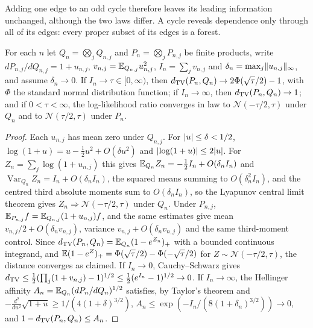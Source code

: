 Adding one edge to an odd cycle therefore leaves its leading information unchanged, although the two
laws differ. A cycle reveals dependence only through all of its edges: every proper subset of its
edges is a forest.

\begin{lemma}\label{spn:lem:product-experiments}
For each $n$ let $Q_n=\bigotimes_jQ_{n,j}$ and $P_n=\bigotimes_jP_{n,j}$ be finite products, write
$dP_{n,j}/dQ_{n,j}=1+u_{n,j}$, $v_{n,j}=\mathbb{E}_{Q_{n,j}}u_{n,j}^2$, $I_n=\sum_jv_{n,j}$ and
$\delta_n=\max_j\lVert u_{n,j}\rVert_\infty$, and assume $\delta_n\to0$. If $I_n\to\tau\in[0,\infty)$,
then $d_{\mathrm{TV}}(P_n,Q_n)\to2\Phi(\sqrt\tau/2)-1$, with $\Phi$ the standard normal distribution
function; if $I_n\to\infty$, then $d_{\mathrm{TV}}(P_n,Q_n)\to1$; and if $0<\tau<\infty$, the log-likelihood
ratio converges in law to $\mathcal N(-\tau/2,\tau)$ under $Q_n$ and to $\mathcal N(\tau/2,\tau)$
under $P_n$.
\end{lemma}

\begin{proof}
Each $u_{n,j}$ has mean zero under $Q_{n,j}$. For $\lvert u\rvert\le\delta<1/2$,
$\log(1+u)=u-\frac12u^2+O(\delta u^2)$ and $\lvert\log(1+u)\rvert\le2\lvert u\rvert$. For
$Z_n=\sum_j\log(1+u_{n,j})$ this gives $\mathbb{E}_{Q_n}Z_n=-\frac12I_n+O(\delta_nI_n)$ and
$\operatorname{Var}_{Q_n}Z_n=I_n+O(\delta_nI_n)$, the squared means summing to
$O(\delta_n^2I_n)$, and the centred third absolute moments sum to $O(\delta_nI_n)$, so the Lyapunov
central limit theorem gives $Z_n\Rightarrow\mathcal N(-\tau/2,\tau)$ under $Q_n$. Under $P_{n,j}$,
$\mathbb{E}_{P_{n,j}}f=\mathbb{E}_{Q_{n,j}}(1+u_{n,j})f$, and the same estimates give mean $v_{n,j}/2+O(\delta_nv_{n,j})$,
variance $v_{n,j}+O(\delta_nv_{n,j})$ and the same third-moment control. Since
$d_{\mathrm{TV}}(P_n,Q_n)=\mathbb{E}_{Q_n}(1-e^{Z_n})_+$ with a bounded continuous integrand, and
$\mathbb{E}(1-e^Z)_+=\Phi(\sqrt\tau/2)-\Phi(-\sqrt\tau/2)$ for $Z\sim\mathcal N(-\tau/2,\tau)$, the
distance converges as claimed. If $I_n\to0$, Cauchy--Schwarz gives
$d_{\mathrm{TV}}\le\frac12(\prod_j(1+v_{n,j})-1)^{1/2}\le\frac12(e^{I_n}-1)^{1/2}\to0$. If $I_n\to\infty$, the
Hellinger affinity $A_n=\mathbb{E}_{Q_n}(dP_n/dQ_n)^{1/2}$ satisfies, by Taylor's theorem and
$-\frac{d^2}{du^2}\sqrt{1+u}\ge1/(4(1+\delta)^{3/2})$,
$A_n\le\exp(-I_n/(8(1+\delta_n)^{3/2}))\to0$, and $1-d_{\mathrm{TV}}(P_n,Q_n)\le A_n$.
\end{proof}

